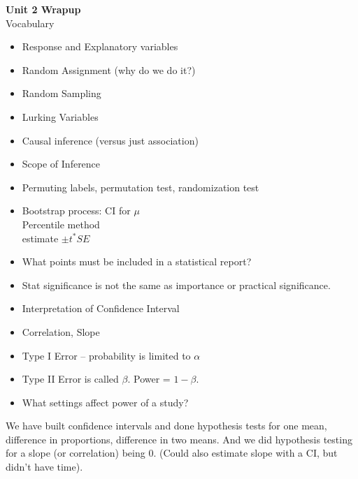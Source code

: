 \def\theTopic{Unit 2 Wrapup }
\def\dayNum{20 }

\begin{center}
\vspace*{-.2in}
{\bf {\large Unit 2 Wrapup}}\\
Vocabulary
\end{center}
\vspace{-.1in}
\begin{itemize}
  \item  Response and Explanatory variables
  \item  Random Assignment (why do we do it?)
  \item  Random Sampling
  \item   Lurking Variables
  \item  Causal inference (versus just association)
  \item Scope of Inference
  \item  Permuting labels, permutation test, randomization test
  \item  Bootstrap process: CI for $\mu$\\
         Percentile method\\
         estimate $\pm t^* SE$
  \item  What points must be included in a statistical report?
  \item  Stat significance is not the same as importance or practical
    significance.
  \item Interpretation of Confidence Interval
  \item Correlation, Slope
  \item  Type I Error  – probability is limited to $\alpha$
  \item  Type II Error is called $\beta$.  Power = $1-\beta$.
  \item  What settings affect power of a study?
  \end{itemize}
  
  We have built confidence intervals and done hypothesis tests for one
  mean, difference in proportions, difference in two means. And we did
  hypothesis testing for a slope (or correlation) being 0. (Could also
  estimate slope with a CI, but didn't have time).

